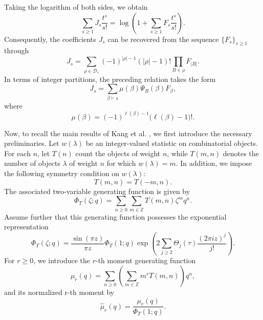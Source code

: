 \documentclass[12pt,oneside,reqno]{amsart}
\numberwithin{equation}{section}
\begin{document}
	Taking the logarithm of both sides, we obtain
	\begin{equation}\label{2e6}
		\sum_{s\geq 1}J_s\frac{t^s}{s!}
		=
		\log\left(1+\sum_{s\geq 1}F_s\frac{t^s}{s!}\right).
	\end{equation}
Consequently, the coefficients $J_s$ can be recovered from the sequence
$\{F_s\}_{s\geq 1}$ through
\begin{equation}\label{2e7}
	J_s
	=
	\sum_{\rho\in\mathscr{D}_s}
	(-1)^{|\rho|-1}(|\rho|-1)!
	\prod_{B\in\rho}F_{|B|}.
\end{equation}
In terms of integer partitions, the preceding relation takes the form
\begin{equation}\label{2e8}
	J_s
	=
	\sum_{\beta\vdash s}
	\mu(\beta)\Psi_B(\beta)F_\beta,
\end{equation}
where
\begin{equation}\label{2e9}
	\mu(\beta)
	=
	(-1)^{\ell(\beta)-1}
	\bigl(\ell(\beta)-1\bigr)!.
\end{equation}

 Now, to recall the main results of Kang et al. \cite{Kang2026}, we first introduce the necessary preliminaries.
	Let $w(\lambda)$ be an integer-valued statistic on combinatorial
	objects. For each $n$, let $T(n)$ count the objects of weight $n$,
	while $T(m,n)$ denotes the number of objects $\lambda$ of weight $n$
	for which $w(\lambda)=m$. In addition, we impose the following
	symmetry condition on $w(\lambda)$:
	\begin{equation}\label{eq1.19}
		T(m,n)=T(-m,n).
	\end{equation}
	The associated two-variable generating function is given by
	\begin{equation}\label{eq1.20}
		\Phi_T(\zeta;q)
		=
		\sum_{n\geq0}\sum_{m\in\mathbb Z}
		T(m,n)\zeta^m q^n.
	\end{equation}
	Assume further that this generating function possesses the
	exponential representation
	\begin{equation}\label{eq1.21}
		\Phi_T(\zeta;q)
		=
		\frac{\sin(\pi z)}{\pi z}\Phi_T(1;q)
		\exp\left(
		2\sum_{j\geq2}
		\Theta_j(\tau)\frac{(2\pi iz)^j}{j!}
		\right).
	\end{equation}
	For $r\geq0$, we introduce the $r$-th moment generating function
	\begin{equation}\label{eq1.22}
		\mu_r(q)
		=
		\sum_{n\geq0}
		\left(
		\sum_{m\in\mathbb Z}m^rT(m,n)
		\right)q^n,
	\end{equation}
	and its normalized r-th moment by
	\begin{equation}\label{eq1.23}
		\widehat{\mu}_r(q)
		=
		\frac{\mu_r(q)}{\Phi_T(1;q)}.
	\end{equation}
	
\end{document}

